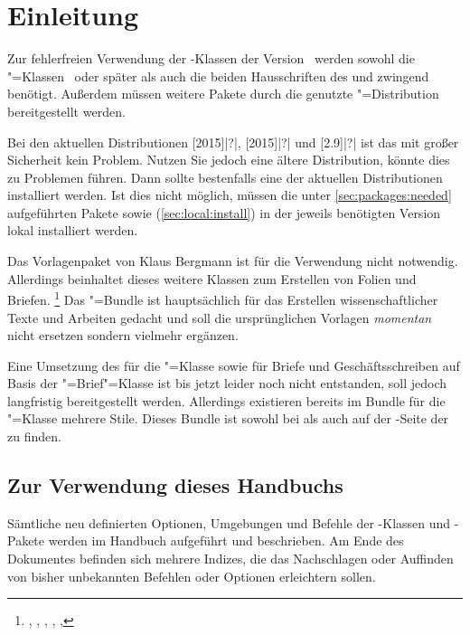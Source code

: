 \chapter{Einleitung}
%
Zur fehlerfreien Verwendung der \TUDScript-Klassen der Version~\vTUDScript{} 
werden sowohl die \KOMAScript"=Klassen~\vKOMAScript{} oder später als auch die 
beiden Hausschriften des \CDs \Univers und \DIN zwingend benötigt. Außerdem 
müssen weitere Pakete durch die genutzte "=Distribution 
bereitgestellt werden. 

Bei den aktuellen Distributionen
%
[2015]|?|,
[2015]|?| und 
[2.9]|?|
ist das mit großer Sicherheit kein Problem. Nutzen Sie jedoch eine ältere 
Distribution, könnte dies zu Problemen führen. Dann sollte bestenfalls eine der 
aktuellen Distributionen installiert werden. Ist dies nicht möglich, müssen die 
unter \autoref{sec:packages:needed} aufgeführten Pakete sowie \TUDScript 
(\autoref{sec:local:install}) in der jeweils benötigten Version lokal 
installiert werden.

Das Vorlagenpaket von Klaus Bergmann ist für die Verwendung nicht notwendig. 
Allerdings beinhaltet dieses weitere Klassen zum Erstellen von Folien 
und Briefen.%
\footnote{%
  , , , , 
  , 
}
Das \TUDScript"=Bundle ist hauptsächlich für das Erstellen wissenschaftlicher 
Texte und Arbeiten gedacht und soll die ursprünglichen Vorlagen \emph{momentan} 
nicht ersetzen sondern vielmehr ergänzen. 

Eine Umsetzung des \CDs für die "=Klasse sowie für Briefe und 
Geschäftsschreiben auf Basis der \KOMAScript"=Brief"=Klasse  
ist bis jetzt leider noch nicht entstanden, soll jedoch langfristig 
bereitgestellt werden. Allerdings existieren bereits im Bundle 
 für die "=Klasse mehrere Stile. Dieses 
Bundle ist sowohl bei  als 
auch auf der  
{-Seite der \TnUD} zu finden.



\section{Zur Verwendung dieses Handbuchs}
Sämtliche neu definierten Optionen, Umgebungen und Befehle der 
\TUDScript-Klassen und \TUDScript-Pakete werden im Handbuch aufgeführt und 
beschrieben. Am Ende des Dokumentes befinden sich mehrere Indizes, die das 
Nachschlagen oder Auffinden von bisher unbekannten Befehlen oder Optionen 
erleichtern sollen.

